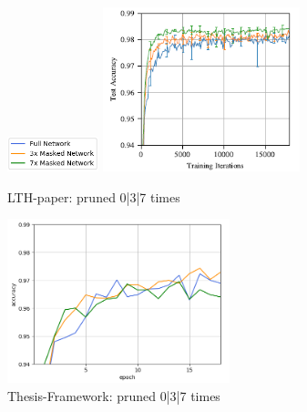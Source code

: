 \begin{figure}
	\begin{minipage}{\textwidth}
		\centering
		\includegraphics[width=100px]{gfx/7-Evaluation/LTH_1_legend.png}
	\end{minipage}
	\begin{minipage}{0.5\textwidth}
		\centering
		\includegraphics[height=180px]{gfx/7-Evaluation/LTH_1.png}
		\caption*{LTH-paper: pruned 0|3|7 times}
		\label{?}
	\end{minipage}\hfill
	\begin{minipage}{0.5\textwidth}
		\centering
		\includegraphics[height=180px]{gfx/Experiments/Reproduction-MNIST-FCN/accuracy/LTH_1.png}
		\caption*{Thesis-Framework: pruned 0|3|7 times}
		\label{?}
	\end{minipage}
\end{figure}

